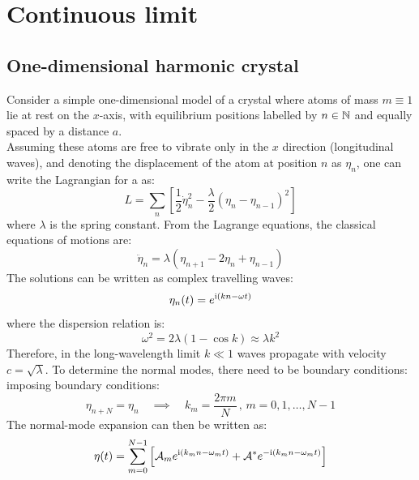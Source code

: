 
\section{Continuous limit}

\subsection{One-dimensional harmonic crystal}

Consider a simple one-dimensional model of a crystal where atoms of mass $ m \equiv 1 $ lie at rest on the $ x $-axis, with equilibrium positions labelled by $ n \in \mathbb{N} $ and equally spaced by a distance $ a $.\\
Assuming these atoms are free to vibrate only in the $ x $ direction (longitudinal waves), and denoting the displacement of the atom at position $ n $ as $ \eta_n $, one can write the Lagrangian for a  as:
\begin{equation}
  L = \sum_{n} \left[ \frac{1}{2} \dot{\eta}_n^2 - \frac{\lambda}{2} \left( \eta_n - \eta_{n-1} \right)^2 \right]
  \label{eq:first-lag}
\end{equation}
where $ \lambda $ is the spring constant. From the Lagrange equations, the classical equations of motions are:
\begin{equation}
  \ddot{\eta}_n = \lambda \left( \eta_{n+1} - 2 \eta_n + \eta_{n-1} \right)
\end{equation}
The solutions can be written as complex travelling waves:
\begin{equation}
  \eta_n (t) = e^{\mathrm{i} \left( k n - \omega t \right)}
\end{equation}
where the dispersion relation is:
\begin{equation}
  \omega^2 = 2\lambda \left( 1 - \cos k \right) \approx \lambda k^2
\end{equation}
Therefore, in the long-wavelength limit $ k \ll 1 $ waves propagate with velocity $ c = \sqrt{\lambda} $. To determine the normal modes, there need to be boundary conditions: imposing boundary conditions:
\begin{equation}
  \eta_{n + N} = \eta_n
  \quad \implies \quad
  k_m = \frac{2\pi m}{N} \,,\, m = 0, 1, \dots, N - 1
\end{equation}
The normal-mode expansion can then be written as:
\begin{equation}
  \eta (t) = \sum_{m = 0}^{N - 1} \left[ \mathcal{A}_m e^{\mathrm{i} \left( k_m n - \omega_m t \right)} + \mathcal{A}^* e^{-\mathrm{i} \left( k_m n - \omega_m t \right)} \right]
  \label{eq:first-exp}
\end{equation}
